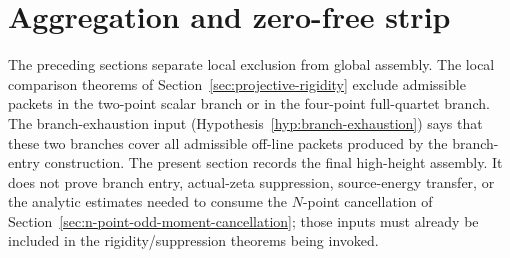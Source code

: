 %
%
%
%
%

\section{Aggregation and zero-free strip}
\label{sec:aggregation-and-zero-free-strip}
\quad
{}\quad
{}\quad
{}\quad
{}\quad
{}
\par\medskip

The preceding sections separate local exclusion from global assembly.  The
local comparison theorems of Section~\ref{sec:projective-rigidity} exclude
admissible packets in the two-point scalar branch or in the four-point
full-quartet branch.  The branch-exhaustion input
(Hypothesis~\ref{hyp:branch-exhaustion}) says that these two branches cover
all admissible off-line packets produced by the branch-entry construction.
The present section records the final high-height assembly.  It does not
prove branch entry, actual-zeta suppression, source-energy transfer, or the
analytic estimates needed to consume the \(N\)-point cancellation of
Section~\ref{sec:n-point-odd-moment-cancellation}; those inputs must already
be included in the rigidity/suppression theorems being invoked.

